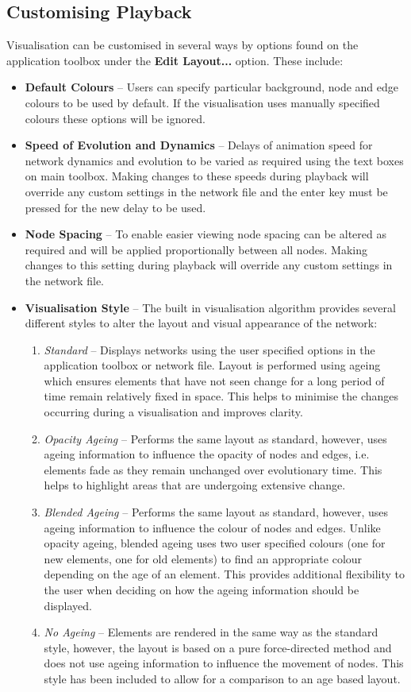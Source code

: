 \documentclass[a4paper, 11pt]{article}
\newcommand{\guitxt}[1]{{\textbf{\textsf{\small{#1}}}}}
\begin{document}
\subsection{Customising Playback}
Visualisation can be customised in several ways by options found on the application toolbox under the \guitxt{Edit Layout...} option. These include:
\begin{itemize}
	\item \textbf{Default Colours} -- Users can specify particular background, node and edge colours to be used by default. If the visualisation uses manually specified colours these options will be ignored.
	\item \textbf{Speed of Evolution and Dynamics} -- Delays of animation speed for network dynamics and evolution to be varied as required using the text boxes on main toolbox. Making changes to these speeds during playback will override any custom settings in the network file and the enter key must be pressed for the new delay to be used.
	\item \textbf{Node Spacing} -- To enable easier viewing node spacing can be altered as required and will be applied proportionally between all nodes. Making changes to this setting during playback will override any custom settings in the network file.
	\item \textbf{Visualisation Style} -- The built in visualisation algorithm provides several different styles to alter the layout and visual appearance of the network:
	\begin{enumerate}
		\item \textit{Standard} -- Displays networks using the user specified options in the application toolbox or network file. Layout is performed using ageing which ensures elements that have not seen change for a long period of time remain relatively fixed in space. This helps to minimise the changes occurring during a visualisation and improves clarity.
		\item \textit{Opacity Ageing} -- Performs the same layout as standard, however, uses ageing information to influence the opacity of nodes and edges, i.e. elements fade as they remain unchanged over evolutionary time. This helps to highlight areas that are undergoing extensive change.
		\item \textit{Blended Ageing} -- Performs the same layout as standard, however, uses ageing information to influence the colour of nodes and edges. Unlike opacity ageing, blended ageing uses two user specified colours (one for new elements, one for old elements) to find an appropriate colour depending on the age of an element. This provides additional flexibility to the user when deciding on how the ageing information should be displayed.
		\item \textit{No Ageing} -- Elements are rendered in the same way as the standard style, however, the layout is based on a pure force-directed method and does not use ageing information to influence the movement of nodes. This style has been included to allow for a comparison to an age based layout.
	\end{enumerate}
\end{itemize}
\end{document}
